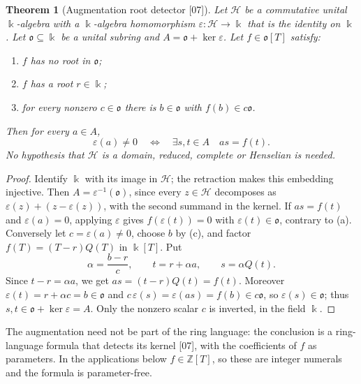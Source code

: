 \documentclass[11pt,oneside]{article}
\numberwithin{equation}{section}
\newtheorem{theorem}{Theorem}[section]
\theoremstyle{definition}
\theoremstyle{remark}
\newcommand{\Z}{\mathbb Z}
\newcommand{\src}[1]{\textup{\textsf{\small[#1]}}}
\begin{document}
\begin{theorem}[Augmentation root detector \src{07}]\label{odg:def:thm:augdetector}
Let $\mathcal H$ be a commutative unital $\Bbbk$-algebra with a
$\Bbbk$-algebra homomorphism $\varepsilon:\mathcal H\to\Bbbk$ that is the
identity on $\Bbbk$. Let $\mathfrak o\subseteq\Bbbk$ be a unital subring and
$A=\mathfrak o+\ker\varepsilon$. Let $f\in\mathfrak o[T]$ satisfy:
\begin{enumerate}[label=\textup{(\alph*)},leftmargin=*]
\item $f$ has no root in $\mathfrak o$;
\item $f$ has a root $r\in\Bbbk$;
\item for every nonzero $c\in\mathfrak o$ there is $b\in\mathfrak o$ with
$f(b)\in c\mathfrak o$.
\end{enumerate}
Then for every $a\in A$,
\begin{equation}\label{odg:def:eq:augdetector}
 \varepsilon(a)\ne0\quad\Longleftrightarrow\quad\exists s,t\in A\quad as=f(t).
\end{equation}
No hypothesis that $\mathcal H$ is a domain, reduced, complete or Henselian is
needed.
\end{theorem}
\begin{proof}
Identify $\Bbbk$ with its image in $\mathcal H$; the retraction makes this
embedding injective. Then $A=\varepsilon^{-1}(\mathfrak o)$, since every
$z\in\mathcal H$ decomposes as $\varepsilon(z)+(z-\varepsilon(z))$, with the
second summand in the kernel.
If $as=f(t)$ and $\varepsilon(a)=0$, applying $\varepsilon$ gives
$f(\varepsilon(t))=0$ with $\varepsilon(t)\in\mathfrak o$, contrary to (a).
Conversely let $c=\varepsilon(a)\ne0$, choose $b$ by (c), and factor
$f(T)=(T-r)Q(T)$ in $\Bbbk[T]$. Put
\begin{equation}\label{odg:def:eq:witness}
 \alpha=\frac{b-r}{c},\qquad t=r+\alpha a,\qquad s=\alpha Q(t).
\end{equation}
Since $t-r=\alpha a$, we get $as=(t-r)Q(t)=f(t)$. Moreover
$\varepsilon(t)=r+\alpha c=b\in\mathfrak o$ and
$c\,\varepsilon(s)=\varepsilon(as)=f(b)\in c\mathfrak o$, so
$\varepsilon(s)\in\mathfrak o$; thus $s,t\in\mathfrak o+\ker\varepsilon=A$. Only
the nonzero scalar $c$ is inverted, in the field $\Bbbk$.
\end{proof}

The augmentation need not be part of the ring language: the conclusion is a
ring-language formula that detects its kernel \src{07}, with the coefficients
of $f$ as parameters. In the applications below $f\in\Z[T]$, so these are
integer numerals and the formula is parameter-free.
\end{document}

